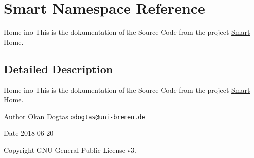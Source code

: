 \hypertarget{namespace_smart}{}\section{Smart Namespace Reference}
\label{namespace_smart}


Home-\/ino This is the dokumentation of the Source Code from the project \mbox{\hyperlink{namespace_smart}{Smart}} Home.  




\subsection{Detailed Description}
Home-\/ino This is the dokumentation of the Source Code from the project \mbox{\hyperlink{namespace_smart}{Smart}} Home. 

\begin{DoxyAuthor}{Author}
Okan Dogtas \href{mailto:odogtas@uni-bremen.de}{\tt odogtas@uni-\/bremen.\+de} 
\end{DoxyAuthor}
\begin{DoxyDate}{Date}
2018-\/06-\/20
\end{DoxyDate}
\begin{DoxyCopyright}{Copyright}
G\+NU General Public License v3. 
\end{DoxyCopyright}
